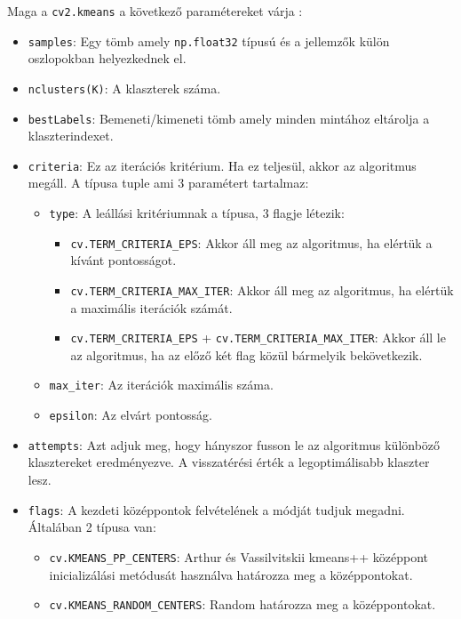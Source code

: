 Maga a \texttt{cv2.kmeans} a következő paramétereket várja \cite{kmeans_opencv}:
\begin{itemize}
\item \texttt{samples}: Egy tömb amely \texttt{np.float32} típusú és a jellemzők külön oszlopokban helyezkednek el.
\item \texttt{nclusters(K)}: A klaszterek száma.
\item \texttt{bestLabels}: Bemeneti/kimeneti tömb amely minden mintához eltárolja a klaszterindexet.
\item \texttt{criteria}: Ez az iterációs kritérium. Ha ez teljesül, akkor az algoritmus megáll. A típusa tuple ami 3 paramétert tartalmaz:
    \begin{itemize}
    \item \texttt{type}: A leállási kritériumnak a típusa, 3 flagje létezik:
        \begin{itemize}
        \item \texttt{cv.TERM\_CRITERIA\_EPS}: Akkor áll meg az algoritmus, ha elértük a kívánt pontosságot.
        \item \texttt{cv.TERM\_CRITERIA\_MAX\_ITER}: Akkor áll meg az algoritmus, ha elértük a maximális iterációk számát.
        \item \texttt{cv.TERM\_CRITERIA\_EPS} + \texttt{cv.TERM\_CRITERIA\_MAX\_ITER}: Akkor áll le az algoritmus, ha az előző két flag közül bármelyik bekövetkezik.
        \end{itemize}
    \item \texttt{max\_iter}: Az iterációk maximális száma.
    \item \texttt{epsilon}: Az elvárt pontosság.
    \end{itemize}
\item \texttt{attempts}: Azt adjuk meg, hogy hányszor fusson le az algoritmus különböző klasztereket eredményezve. A visszatérési érték a legoptimálisabb klaszter lesz.
\item \texttt{flags}: A kezdeti középpontok felvételének a módját tudjuk megadni. Általában 2 típusa van:
    \begin{itemize}
    \item \texttt{cv.KMEANS\_PP\_CENTERS}: Arthur és Vassilvitskii kmeans++ középpont inicializálási metódusát használva határozza meg a középpontokat.
    \item \texttt{cv.KMEANS\_RANDOM\_CENTERS}: Random határozza meg a középpontokat.
    \end{itemize}
\end{itemize}

